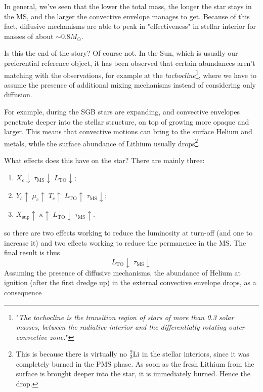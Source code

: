 \par In general, we've seen that the lower the total mass, the longer the star stays in the MS, and the larger the convective envelope manages to get. Because of this fact, diffusive mechanisms are able to peak in "effectiveness" in stellar interior for masses of about $\sim 0.8M_{\odot}$.
\par Is this the end of the story? Of course not. In the Sun, which is usually our preferential reference object, it has been observed that certain abundances aren't matching with the observations, for example at the \emph{tachocline}\footnote{"\emph{The tachocline is the transition region of stars of more than 0.3 solar masses, between the radiative interior and the differentially rotating outer convective zone.}"}, where we have to assume the presence of additional mixing mechanisms instead of considering only diffusion.
\par For example, during the SGB stars are expanding, and convective envelopes penetrate deeper into the stellar structure, on top of growing more opaque and larger. This means that convective motions can bring to the surface Helium and metals, while the surface abundance of Lithium usually drops\footnote{This is because there is virtually no $\element{Li}{7}{3}$ in the stellar interiors, since it was completely burned in the PMS phase. As soon as the fresh Lithium from the surface is brought deeper into the star, it is immediately burned. Hence the drop.}.
\par What effects does this have on the star? There are mainly three:
\begin{enumerate}
    \item $X_{c}\downarrow\;\tau_{\text{MS}}\downarrow\;L_{\text{TO}}\downarrow$;
    \item $Y_{c}\uparrow\;\mu_{c}\uparrow\;T_{c}\uparrow\;L_{\text{TO}}\uparrow\;\tau_{\text{MS}}\downarrow$;
    \item $X_{\text{sup}}\uparrow\;\bar{\kappa}\uparrow\;L_{\text{TO}}\downarrow\;\tau_{\text{MS}}\uparrow$.
\end{enumerate}
so there are two effects working to reduce the luminosity at turn-off (and one to increase it) and two effects working to reduce the permanence in the MS. The final result is thus
\begin{equation*}
    L_{\text{TO}}\downarrow\;\tau_{\text{MS}}\downarrow
\end{equation*}
Assuming the presence of diffusive mechanisms, the abundance of Helium at ignition (after the first dredge up) in the external convective envelope drops, as a consequence
